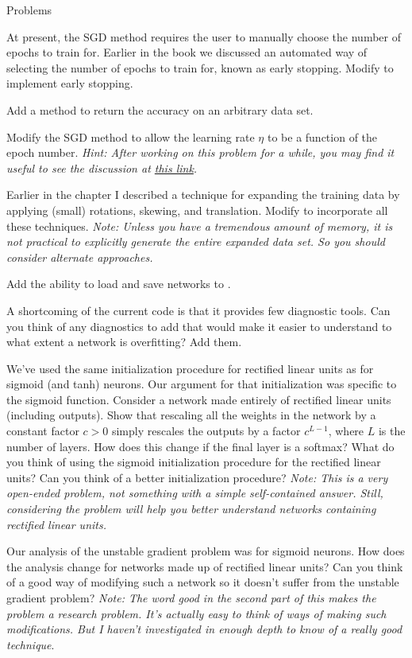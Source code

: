 \documentclass[a4paper,twoside,10pt]{book}
\begin{document}
\begin{exercize}{Problems}
\item At present, the SGD method requires the user to manually choose the number of epochs to train for. Earlier in the book we discussed an automated way of selecting the number of epochs to train for, known as early stopping. Modify  to implement early stopping.
\item Add a  method to return the accuracy on an arbitrary data set.
\item Modify the SGD method to allow the learning rate $\eta$ to be a function of the epoch number. \textit{Hint: After working on this problem for a while, you may find it useful to see the discussion at \href{https://groups.google.com/forum/\#!topic/theano-users/NQ9NYLvleGc}{this link}.}
\item Earlier in the chapter I described a technique for expanding the training data by applying (small) rotations, skewing, and translation. Modify  to incorporate all these techniques. \textit{Note: Unless you have a tremendous amount of memory, it is not practical to explicitly generate the entire expanded data set. So you should consider alternate approaches.}
\item Add the ability to load and save networks to .
\item A shortcoming of the current code is that it provides few diagnostic tools. Can you think of any diagnostics to add that would make it easier to understand to what extent a network is overfitting? Add them.
\item We've used the same initialization procedure for rectified linear units as for sigmoid (and tanh) neurons. Our argument for that initialization was specific to the sigmoid function. Consider a network made entirely of rectified linear units (including outputs). Show that rescaling all the weights in the network by a constant factor $c>0$ simply rescales the outputs by a factor $c^{L-1}$, where $L$ is the number of layers. How does this change if the final layer is a softmax? What do you think of using the sigmoid initialization procedure for the rectified linear units? Can you think of a better initialization procedure? \textit{Note: This is a very open-ended problem, not something with a simple self-contained answer. Still, considering the problem will help you better understand networks containing rectified linear units.}
\item Our analysis of the unstable gradient problem was for sigmoid neurons. How does the analysis change for networks made up of rectified linear units? Can you think of a good way of modifying such a network so it doesn't suffer from the unstable gradient problem? \textit{Note: The word good in the second part of this makes the problem a research problem. It's actually easy to think of ways of making such modifications. But I haven't investigated in enough depth to know of a really good technique}.
\end{exercize}
\end{document}
